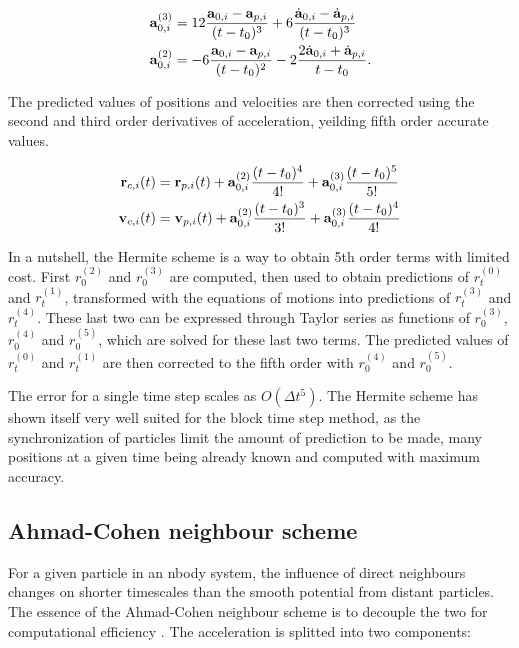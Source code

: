 \begin{align}
\bold{a}^{(3)}_{0,i} &= 12 \frac{\bold{a}_{0,i} - \bold{a}_{p,i}}{(t-t_0)^3} +6 \frac{\dot{\bold{a}}_{0,i} - \dot{\bold{a}}_{p,i}}{(t-t_0)^3}\\
\bold{a}^{(2)}_{0,i} &= -6 \frac{\bold{a}_{0,i} - \bold{a}_{p,i}}{(t-t_0)^2} - 2 \frac{2\dot{\bold{a}}_{0,i} + \dot{\bold{a}}_{p,i}}{t-t_0}.
\end{align}

The predicted values of positions and velocities are then corrected using the second and third order derivatives of acceleration, yeilding fifth order accurate values.

\begin{align}
\bold{r}_{c,i}(t) &= \bold{r}_{p,i}(t) + \bold{a}^{(2)}_{0,i} \frac{(t-t_0)^4}{4!} +
	 \bold{a}^{(3)}_{0,i} \frac{(t-t_0)^5}{5!}\\
\bold{v}_{c,i}(t) &= \bold{v}_{p,i}(t) + \bold{a}^{(2)}_{0,i} \frac{(t-t_0)^3}{3!} +
	 \bold{a}^{(3)}_{0,i} \frac{(t-t_0)^4}{4!}\\
\end{align}

In a nutshell, the Hermite scheme is a way to obtain 5th order terms with limited cost. First $r_0^{(2)}$ and $r_0^{(3)}$ are computed, then used to obtain predictions of $r_t^{(0)}$ and $r_t^{(1)}$, transformed with the equations of motions into predictions of $r_t^{(3)}$ and $r_t^{(4)}$. These last two can be expressed through Taylor series as functions of $r_0^{(3)}$,$r_0^{(4)}$ and $r_0^{(5)}$, which are solved for these last two terms. The predicted values of $r_t^{(0)}$ and $r_t^{(1)}$ are then corrected to the fifth order with $r_0^{(4)}$ and $r_0^{(5)}$.

The error for a single time step scales as $O(\Delta t^5)$. The Hermite scheme has shown itself very well suited for the block time step method, as the synchronization of particles limit the amount of prediction to be made, many positions at a given time being already known and computed with maximum accuracy.


\subsection{Ahmad-Cohen neighbour scheme}

For a given particle in an nbody system, the influence of direct neighbours changes on shorter timescales than the smooth potential from distant particles. The essence of the Ahmad-Cohen neighbour scheme is to decouple the two for computational efficiency \citep{AhmadCohen1973}. The acceleration is splitted into two components:

